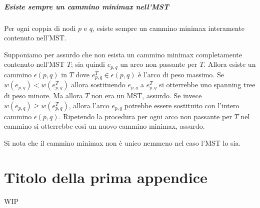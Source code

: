 \documentclass[target=bach,aauheader=,style=]{thud}
\newcommand{\eng}[1]{\foreignlanguage{english}{#1}}
\begin{document}
\paragraph{Esiste sempre un cammino minimax nell'MST}
Per ogni coppia di nodi $p$ e $q$, esiste sempre un cammino minimax interamente contenuto nell'MST.

Supponiamo per assurdo che non esista un cammino minimax completamente contenuto nell'MST $T$; sia quindi $e_{p,q}$ un arco non passante per $T$. Allora esiste un cammino $\epsilon(p,q)$ in $T$ dove $e_{p,q}^T\in\epsilon(p,q)$ è l'arco di peso massimo. Se $w(e_{p,q})<w(e_{p,q}^T)$ allora sostituendo $e_{p,q}$ a $e_{p,q}^T$ si otterrebbe uno \eng{spanning tree} di peso minore. Ma allora $T$ non era un MST, assurdo. Se invece $w(e_{p,q})\geq w(e_{p,q}^T)$, allora l'arco $e_{p,q}$ potrebbe essere sostituito con l'intero cammino $\epsilon(p,q)$. Ripetendo la procedura per ogni arco non passante per $T$ nel cammino si otterrebbe così un nuovo cammino minimax, assurdo.

Si nota che il cammino minimax non è unico nemmeno nel caso l'MST lo sia.

\appendix


\chapter{Titolo della prima appendice}
WIP

\backmatter




\end{document}
